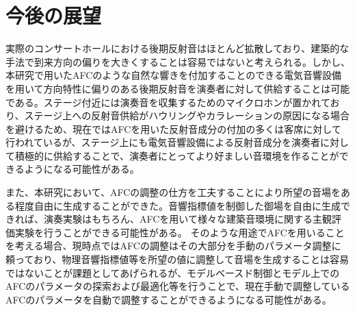 \documentclass[11pt,a4j]{jreport}
\begin{document}
\section{今後の展望}
実際のコンサートホールにおける後期反射音はほとんど拡散しており、建築的な手法で到来方向の偏りを大きくすることは容易ではないと考えられる。しかし、本研究で用いたAFCのような自然な響きを付加することのできる電気音響設備を用いて方向特性に偏りのある後期反射音を演奏者に対して供給することは可能である。ステージ付近には演奏音を収集するためのマイクロホンが置かれており、ステージ上への反射音供給がハウリングやカラレーションの原因になる場合を避けるため、現在ではAFCを用いた反射音成分の付加の多くは客席に対して行われているが、ステージ上にも電気音響設備による反射音成分を演奏者に対して積極的に供給することで、演奏者にとってより好ましい音環境を作ることができるようになる可能性がある。

また、本研究において、AFCの調整の仕方を工夫することにより所望の音場をある程度自由に生成することができた。音響指標値を制御した御場を自由に生成できれば、演奏実験はもちろん、AFCを用いて様々な建築音環境に関する主観評価実験を行うことができる可能性がある。
そのような用途でAFCを用いることを考える場合、現時点ではAFCの調整はその大部分を手動のパラメータ調整に頼っており、物理音響指標値等を所望の値に調整して音場を生成することは容易ではないことが課題としてあげられるが、モデルベースド制御とモデル上でのAFCのパラメータの探索および最適化等を行うことで、現在手動で調整しているAFCのパラメータを自動で調整することができるようになる可能性がある。


\clearpage


\end{document}
